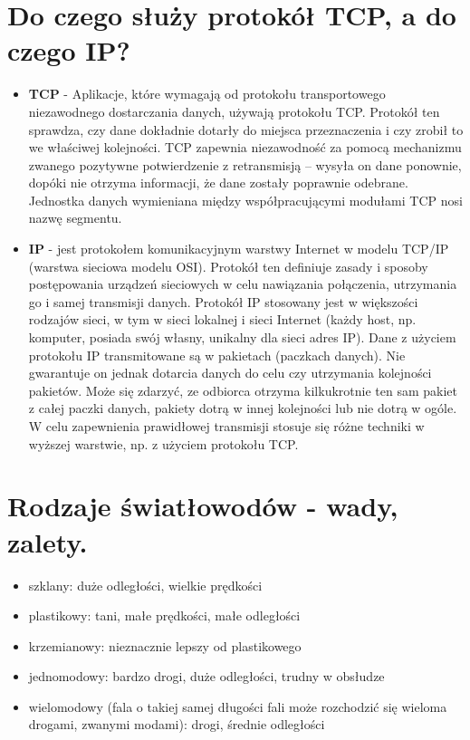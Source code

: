 \documentclass[12pt,a4paper]{article}
\begin{document}
	\section{Do czego służy protokół TCP, a do czego IP?}
	\begin{itemize}
		\item \textbf{TCP} - Aplikacje, które wymagają od protokołu transportowego niezawodnego dostarczania danych, używają protokołu TCP. Protokół ten sprawdza, czy dane dokładnie dotarły do miejsca przeznaczenia i czy zrobił to we właściwej kolejności. TCP zapewnia niezawodność za pomocą mechanizmu zwanego pozytywne potwierdzenie z retransmisją – wysyła on dane ponownie, dopóki nie otrzyma informacji, że dane zostały poprawnie odebrane. Jednostka danych wymieniana między współpracującymi modułami TCP nosi nazwę segmentu.
		\item \textbf{IP} - jest protokołem komunikacyjnym warstwy Internet w modelu TCP/IP (warstwa sieciowa modelu OSI). Protokół ten definiuje zasady i sposoby postępowania urządzeń sieciowych w celu nawiązania połączenia, utrzymania go i samej transmisji danych. Protokół IP stosowany jest w większości rodzajów sieci, w tym w sieci lokalnej i sieci Internet (każdy host, np. komputer, posiada swój własny, unikalny dla sieci adres IP). Dane z użyciem protokołu IP transmitowane są w pakietach (paczkach danych). Nie gwarantuje on jednak dotarcia danych do celu czy utrzymania kolejności pakietów. Może się zdarzyć, ze odbiorca otrzyma kilkukrotnie ten sam pakiet z całej paczki danych, pakiety dotrą w innej kolejności lub nie dotrą w ogóle. W celu zapewnienia prawidłowej transmisji stosuje się różne techniki w wyższej warstwie, np. z użyciem protokołu TCP.
	\end{itemize}

	\section{Rodzaje światłowodów - wady, zalety.}
	\begin{itemize}
		\item szklany: duże odległości, wielkie prędkości
		\item plastikowy: tani, małe prędkości, małe odległości
		\item krzemianowy: nieznacznie lepszy od plastikowego
		\item jednomodowy: bardzo drogi, duże odległości, trudny w obsłudze
		\item wielomodowy (fala o takiej samej długości fali może rozchodzić się wieloma drogami, zwanymi modami): drogi, średnie odległości
	\end{itemize}
\end{document}
